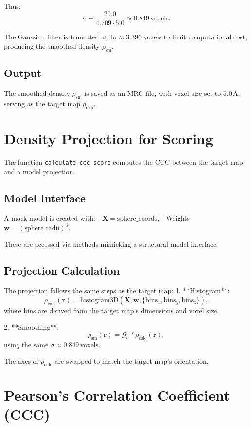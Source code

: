 \documentclass{article}
\begin{document}
Thus:
\[
\sigma = \frac{20.0}{4.709 \cdot 5.0} \approx 0.849 \, \text{voxels}.
\]

The Gaussian filter is truncated at \( 4\sigma \approx 3.396 \) voxels to limit computational cost, producing the smoothed density \( \rho_{\text{sm}} \).

\subsection{Output}

The smoothed density \( \rho_{\text{sm}} \) is saved as an MRC file, with voxel size set to \( 5.0 \, \text{\AA} \), serving as the target map \( \rho_{\text{exp}} \).

\section{Density Projection for Scoring}

The function \texttt{calculate\_ccc\_score} computes the CCC between the target map and a model projection.

\subsection{Model Interface}

A mock model is created with:
- \( \mathbf{X} = \text{sphere\_coords} \),
- Weights \( \mathbf{w} = (\text{sphere\_radii})^3 \).

These are accessed via methods mimicking a structural model interface.

\subsection{Projection Calculation}

The projection follows the same steps as the target map:
1. **Histogram**:
\[
\rho_{\text{calc}}(\mathbf{r}) = \text{histogram3D}(\mathbf{X}, \mathbf{w}, \{\text{bins}_x, \text{bins}_y, \text{bins}_z\}),
\]
where bins are derived from the target map's dimensions and voxel size.

2. **Smoothing**:
\[
\rho_{\text{sm}}(\mathbf{r}) = \mathcal{G}_{\sigma} * \rho_{\text{calc}}(\mathbf{r}),
\]
using the same \( \sigma \approx 0.849 \, \text{voxels} \).

The axes of \( \rho_{\text{calc}} \) are swapped to match the target map’s orientation.

\section{Pearson's Correlation Coefficient (CCC)}
\end{document}

